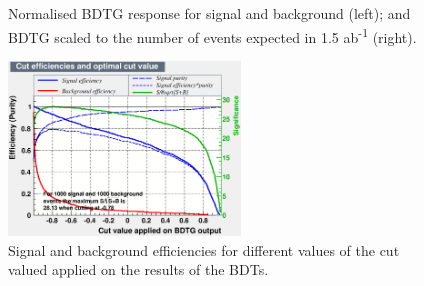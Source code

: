 \begin{figure}[h]%
	\centering
    \qquad
    \caption{Normalised BDTG response for signal and background (left); and BDTG scaled to the number of events expected in 1.5 ab\textsuperscript{-1} (right).}%
    \label{figure:analysis/results/bdt-response}%
\end{figure}

\begin{figure}[h]
	\centering
	\includegraphics[width=0.55\textwidth]{../Pictures/Analysis/BDTs/mvaeffs_BDTG.eps}
	\caption{Signal and background efficiencies for different values of the cut valued applied on the results of the BDTs.}
	\label{figure:analysis/results/tmva-efficiency}
\end{figure}


